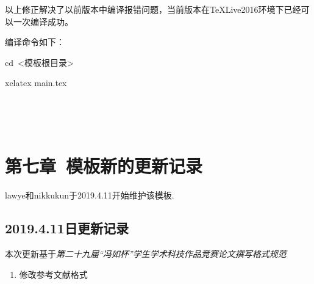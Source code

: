 \documentclass{ctexart}
\begin{document}
以上修正解决了以前版本中编译报错问题，当前版本在TeXLive2016环境下已经可以一次编译成功。 \par

编译命令如下： \par
cd\ <模板根目录> \par
xelatex main.tex \par

\par \ 
\par \ 

\section{第七章\ 模板新的更新记录}

lawye和nikkukun于2019.4.11开始维护该模板.

\subsection{2019.4.11日更新记录}
本次更新基于\it{第二十九届“冯如杯”学生学术科技作品竞赛论文撰写格式规范}\cite{格式}
\begin{enumerate}
    \item 修改参考文献格式

\end{enumerate}

\newpage
{}%


%



\end{document}
